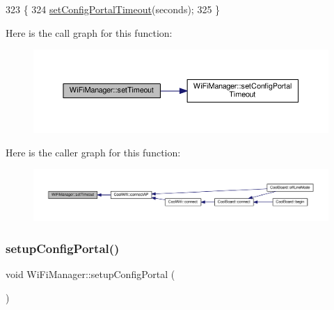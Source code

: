 \begin{DoxyCode}
323                                                   \{
324   \hyperlink{class_wi_fi_manager_a904006cb4d2c769e93bfdef336853766}{setConfigPortalTimeout}(seconds);
325 \}
\end{DoxyCode}
Here is the call graph for this function\+:\nopagebreak
\begin{figure}[H]
\begin{center}
\leavevmode
\includegraphics[width=350pt]{d4/dc8/class_wi_fi_manager_aa6493d59c284ff245edb767ff684756d_cgraph}
\end{center}
\end{figure}
Here is the caller graph for this function\+:\nopagebreak
\begin{figure}[H]
\begin{center}
\leavevmode
\includegraphics[width=350pt]{d4/dc8/class_wi_fi_manager_aa6493d59c284ff245edb767ff684756d_icgraph}
\end{center}
\end{figure}
\mbox{\label{class_wi_fi_manager_a1743325d0dd86d011df96b22d2a0ddd6}} 
\subsubsection{\texorpdfstring{setup\+Config\+Portal()}{setupConfigPortal()}}
{\footnotesize\ttfamily void Wi\+Fi\+Manager\+::setup\+Config\+Portal (\begin{DoxyParamCaption}{ }\end{DoxyParamCaption})\hspace{0.3cm}{\ttfamily [private]}}



